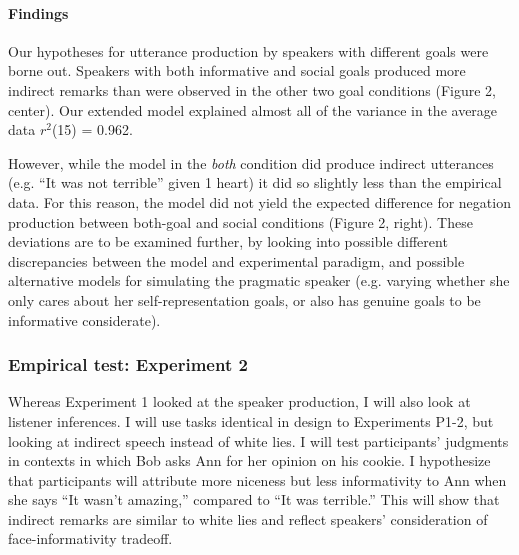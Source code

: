 \paragraph{Findings}

Our hypotheses for utterance production by speakers with different goals
were borne out. Speakers with both
informative and social goals produced more indirect remarks than were
observed in the other two goal conditions (Figure 2, center). 
Our extended model explained almost all of the variance in the
average data \(r^2\)(15) = 0.962. 

However, while the model in the \emph{both} condition did produce indirect
utterances (e.g. ``It was not terrible'' given 1 heart) it did so
slightly less than the empirical data. For this reason, the model did
not yield the expected difference for negation production between
both-goal and social conditions (Figure 2, right). 
These deviations are to be examined further,
by looking into possible different discrepancies between the model and experimental paradigm, 
and possible alternative models for simulating the pragmatic speaker 
(e.g. varying whether she only cares about her self-representation goals, 
or also has genuine goals to be informative considerate).

\subsubsection{Empirical test: Experiment 2} Whereas Experiment 1 looked at the speaker production, I will also look at listener inferences. I will use tasks identical in design to Experiments P1-2, but looking at indirect speech instead of white lies. I will test participants' judgments in contexts in which Bob asks Ann for her opinion on his cookie. I hypothesize that participants will attribute more niceness but less informativity to Ann when she says ``It wasn't amazing,'' compared to ``It was terrible.'' This will show that indirect remarks are similar to white lies and reflect speakers' consideration of face-informativity tradeoff.






